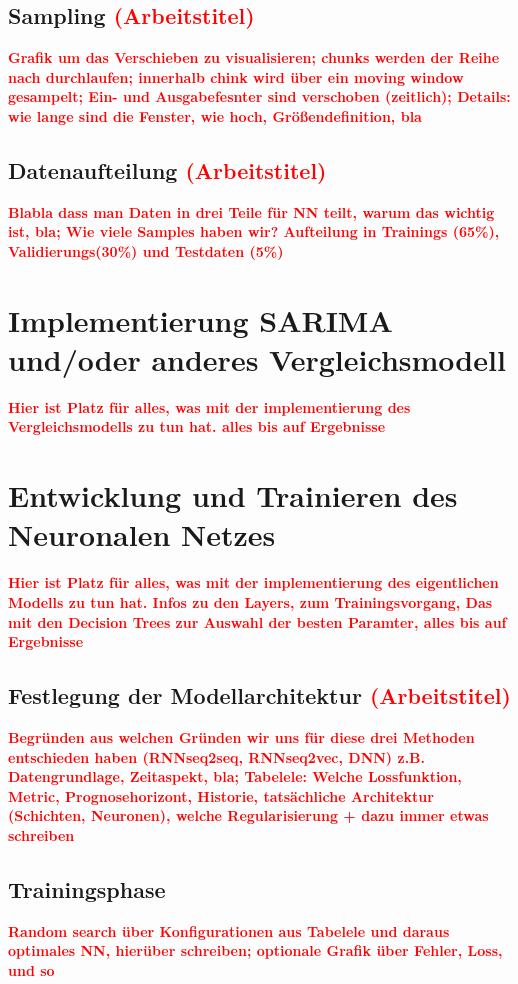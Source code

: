 \documentclass[
12pt, %
toc=listofnumbered, %
toc=chapterentrydotfill, %
numbers=noenddot, %
captions=tableheading, %
]{scrreprt}
\let\Oldsection\section
\renewcommand{\section}{\FloatBarrier\Oldsection}
\let\Oldsubsection\subsection
\renewcommand{\subsection}{\FloatBarrier\Oldsubsection}
\newcommand{\highlight}[1]{\textbf{\textcolor{red}{#1}}}
\begin{document}
\subsection{Sampling \highlight{(Arbeitstitel)}}
\highlight{Grafik um das Verschieben zu visualisieren; chunks werden der Reihe nach durchlaufen; 
innerhalb chink wird über ein moving window gesampelt; Ein- und Ausgabefesnter sind verschoben (zeitlich); 
Details: wie lange sind die Fenster, wie hoch, Größendefinition, bla}

\subsection{Datenaufteilung \highlight{(Arbeitstitel)}}
\highlight{Blabla dass man Daten in drei Teile für NN teilt, warum das wichtig ist, bla; 
Wie viele Samples haben wir? Aufteilung in Trainings (65\%), Validierungs(30\%) und Testdaten (5\%)}

\section{Implementierung SARIMA und/oder anderes Vergleichsmodell}
\highlight{Hier ist Platz für alles, was mit der implementierung des Vergleichsmodells zu tun hat. 
alles bis auf Ergebnisse}

\section{Entwicklung und Trainieren des Neuronalen Netzes}
\highlight{Hier ist Platz für alles, was mit der implementierung des eigentlichen Modells zu tun hat. 
Infos zu den Layers, zum Trainingsvorgang, Das mit den Decision Trees zur Auswahl der besten Paramter, 
alles bis auf Ergebnisse}

\subsection{Festlegung der Modellarchitektur \highlight{(Arbeitstitel)}}
\highlight{Begründen aus welchen Gründen wir uns für diese drei Methoden entschieden haben 
(RNNseq2seq, RNNseq2vec, DNN) z.B. Datengrundlage, Zeitaspekt, bla; 
Tabelele: Welche Lossfunktion, Metric, Prognosehorizont, Historie, tatsächliche Architektur (Schichten, Neuronen), 
welche Regularisierung + dazu immer etwas schreiben }

\subsection{Trainingsphase}
\highlight{Random search über Konfigurationen aus Tabelele und daraus optimales NN, hierüber schreiben; 
optionale Grafik über Fehler, Loss, und so}
\end{document}
